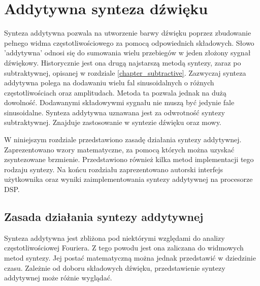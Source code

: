 \chapter{Addytywna synteza dźwięku}\label{chapter_additive}
Synteza addytywna pozwala na utworzenie barwy dźwięku poprzez zbudowanie pełnego widma częstotliwościowego za pomocą odpowiednich składowych. Słowo 'addytywna' odnosi się do sumowania wielu przebiegów w jeden złożony sygnał dźwiękowy. Historycznie jest ona drugą najstarszą metodą syntezy, zaraz po subtraktywnej, opisanej w rozdziale \ref{chapter_subtractive}.
Zazwyczaj synteza addytywna polega na dodawaniu wielu fal sinusoidalnych o różnych częstotliwościach oraz amplitudach. Metoda ta pozwala jednak na dużą dowolność. Dodawanymi składowywmi sygnału nie muszą być jedynie fale sinusoidalne.
Synteza addytywna uznawana jest za odwrotność syntezy subtraktywnej. Znajduje zastosowanie w syntezie dźwięku oraz mowy.

W niniejszym rozdziale przedstawiono zasadę działania syntezy addytywnej. Zaprezentowano wzory matematyczne, za pomocą których można uzyskać zsyntezowane brzmienie. Przedstawiono również kilka metod implementacji tego rodzaju syntezy. Na końcu rozdziału zaprezentowano autorski interfejs użytkownika oraz wyniki zaimplementowania syntezy addytywnej na procesorze DSP.

\section{Zasada działania syntezy addytywnej}
Synteza addytywna jest zbliżona pod niektórymi względami do analizy częstotliwościowej Fouriera. Z tego powodu jest ona zaliczana do widmowych metod syntezy. Jej postać matematyczną można jednak przedstawić w dziedzinie czasu. Zależnie od doboru składowych dźwięku, przedstawienie syntezy addytywnej może różnie wyglądać.

